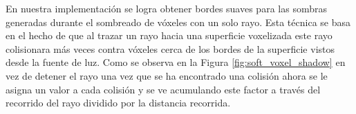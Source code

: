 En nuestra implementación se logra obtener bordes suaves para las sombras generadas durante el sombreado de vóxeles con un solo rayo. Esta técnica se basa en el hecho de que al trazar un rayo hacia una superficie voxelizada este rayo colisionara más veces contra vóxeles cerca de los bordes de la superficie vistos desde la fuente de luz. Como se observa en la Figura \ref{fig:soft_voxel_shadow} en vez de detener el rayo una vez que se ha encontrado una colisión ahora se le asigna un valor a cada colisión y se ve acumulando este factor a través del recorrido del rayo dividido por la distancia recorrida.


